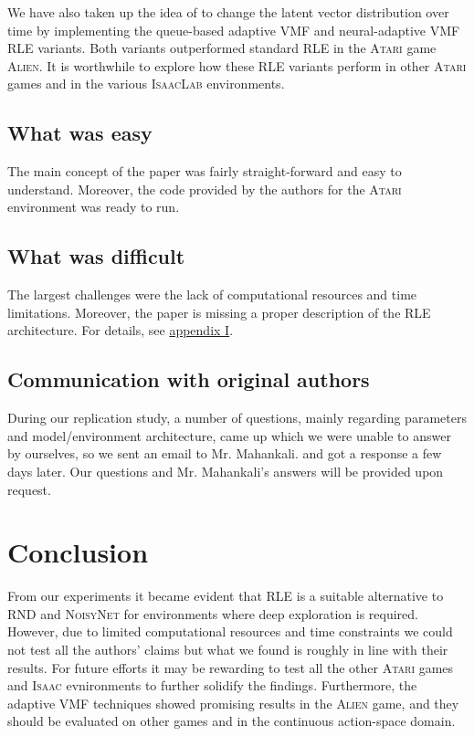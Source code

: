 \documentclass[10pt]{article} %
\begin{document}
We have also taken up the idea of \cite{rle-paper} to change the latent vector distribution over time by implementing the queue-based adaptive VMF and neural-adaptive VMF \textsc{RLE} variants. Both variants outperformed standard \textsc{RLE} in the \textsc{Atari} game \textsc{Alien}. It is worthwhile to explore how these \textsc{RLE} variants perform in other \textsc{Atari} games and in the various \textsc{IsaacLab} environments.

\subsection{What was easy}

The main concept of the paper was fairly straight-forward and easy to understand. Moreover, the code provided by the authors for the \textsc{Atari} environment was ready to run.

\subsection{What was difficult}

The largest challenges were the lack of computational resources and time limitations. Moreover, the paper is missing a proper description of the \textsc{RLE} architecture. For details, see \hyperlink{appendix-difficult}{appendix I}.

\subsection{Communication with original authors}

During our replication study, a number of questions, mainly regarding parameters and model/environment architecture, came up which we were unable to answer by ourselves, so we sent an email to Mr. Mahankali. and got a response a few days later. Our questions and Mr. Mahankali's answers will be provided upon request. 

\vspace{-3pt}
\section{Conclusion}
\vspace{-3pt}

From our experiments it became evident that \textsc{RLE} is a suitable alternative to \textsc{RND} and \textsc{NoisyNet} for environments where deep exploration is required. However, due to limited computational resources and time constraints we could not test all the authors' claims but what we found is roughly in line with their results. For future efforts it may be rewarding to test all the other \textsc{Atari} games and \textsc{Isaac} evnironments to further solidify the findings. Furthermore, the adaptive VMF techniques showed promising results in the \textsc{Alien} game, and they should be evaluated on other games and in the continuous action-space domain.
\end{document}
